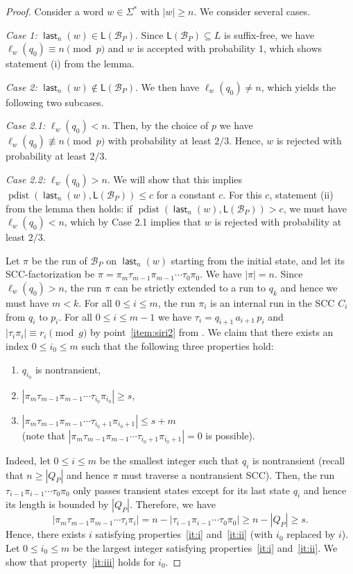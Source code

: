 \documentclass{article}\usepackage[a4paper,margin=20mm]{geometry}
\newcommand{\B}{\mathcal{B}}
\renewcommand{\L}{\mathsf{L}}
\DeclareMathOperator{\last}{\mathsf{last}}
\DeclareMathOperator{\pdist}{pdist}
\renewcommand{\geq}{\geqslant}
\renewcommand{\leq}{\leqslant}
\renewcommand{\ge}{\geq}
\renewcommand{\le}{\leq}
\begin{document}
\begin{proof} Consider a word $w \in \Sigma^*$ with $|w| \ge n$.
We consider several cases.

\medskip\noindent
{\em Case 1:} $\last_n(w) \in \L(\B_P)$. Since $\L(\B_P) \subseteq L$ is suffix-free, we have $\ell_w (q_0) \equiv n \pmod p$ and $w$ is accepted with probability $1$,
which shows statement (i) from the lemma.

\medskip\noindent
{\em Case 2:} $\last_n(w) \notin \L(\B_P)$. We then have $\ell_w (q_0) \neq n$, which yields the following two subcases.

\medskip\noindent
{\em Case 2.1:} $\ell_w(q_0) < n$.
Then, by the choice of $p$ we have $\ell_w(q_0) \not \equiv n \pmod p$ with probability at least $2/3$. 
Hence, $w$ is rejected with probability at least $2/3$.

\medskip\noindent
{\em Case 2.2:}  $\ell_w(q_0) > n$.
We will show that this implies $\pdist(\last_n(w), \L(\B_P)) \le c$ for a constant $c$. 
For this $c$, statement (ii) from the lemma then holds: if $\pdist(\last_n(w), \L(\B_P)) > c$, we must have  
$\ell_w(q_0) < n$, which by Case 2.1 implies that $w$ is rejected with probability at least $2/3$.
 
Let $\pi$ be the run of $\B_P$ on $\last_n(w)$ starting from the initial state,
and let its SCC-factorization be $\pi = \pi_m \tau_{m-1} \pi_{m-1} \cdots \tau_0 \pi_0$. 
We have $|\pi|=n$.
Since $\ell_w(q_0) > n$, the run $\pi$ can be strictly extended to a run to $q_k$ and hence we must have $m < k$. 
For all $0 \leq i \leq m$, the run $\pi_i$ is an internal run in the SCC $C_i$ from $q_i$ to $p_i$.
For all $0 \le i \le m-1$ we have $\tau_i = q_{i+1} \, a_{i+1}\, p_i$  and $|\tau_i \pi_i| \equiv r_i \pmod g$
by point~\ref{item:siri2} from .
We claim that there exists an index $0 \le i_0 \le m$ such that the following three properties hold:
\begin{enumerate}[ref=(\arabic{*})]
\item \label{it:i} $q_{i_0}$ is nontransient,
\item \label{it:ii} $|\pi_m \tau_{m-1} \pi_{m-1} \cdots \tau_{i_0} \pi_{i_0}| \ge s$,
\item \label{it:iii} $|\pi_m \tau_{m-1} \pi_{m-1} \cdots \tau_{{i_0}+1} \pi_{{i_0}+1}| \le s + m$ \\
(note that $|\pi_m \tau_{m-1} \pi_{m-1} \cdots \tau_{{i_0}+1} \pi_{{i_0}+1}| = 0$ is possible).
\end{enumerate}
Indeed, let $0 \le i \le m$ be the smallest integer such that $q_i$ is nontransient
(recall that $n \ge |Q_P|$ and hence $\pi$ must traverse a nontransient SCC).
Then, the run $\tau_{i-1} \pi_{i-1} \cdots \tau_0 \pi_0$ only passes transient states except for 
its last state $q_i$ and hence its length is bounded by $|Q_P|$.
Therefore, we have
\[
	|\pi_m \tau_{m-1} \pi_{m-1} \cdots \tau_i \pi_i| = n - |\tau_{i-1} \pi_{i-1} \cdots \tau_0 \pi_0| \ge n-|Q_P| \ge s.
\]
Hence, there exists $i$ satisfying properties~\ref{it:i} and~\ref{it:ii} (with $i_0$ replaced by $i$).
Let $0 \le {i_0} \le m$ be the largest integer satisfying properties~\ref{it:i} and~\ref{it:ii}.
We show that property~\ref{it:iii} holds for $i_0$.


\end{proof}
\end{document}
